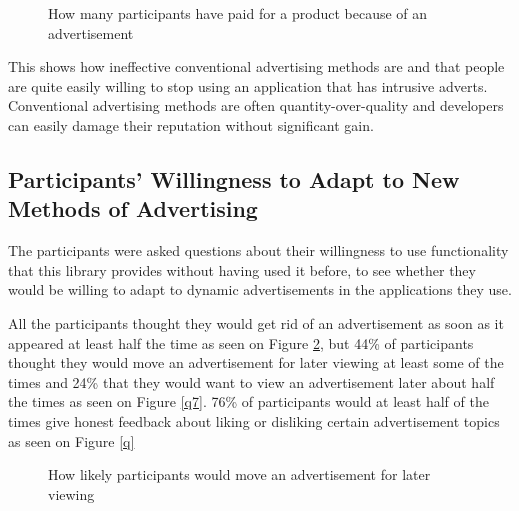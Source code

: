 \begin{figure}
\begin{center}
\caption{How many participants have paid for a product because of an advertisement}
\label{q5}
\end{center}
\end{figure}

This shows how ineffective conventional advertising methods are and that people are quite easily willing to stop using an application that has intrusive adverts. Conventional advertising methods are often quantity-over-quality and developers can easily damage their reputation without significant gain.

\subsection{Participants' Willingness to Adapt to New Methods of Advertising}

The participants were asked questions about their willingness to use functionality that this library provides without having used it before, to see whether they would be willing to adapt to dynamic advertisements in the applications they use.

All the participants thought they would get rid of an advertisement as soon as it appeared at least half the time as seen on Figure \ref{q6}, but 44\% of participants thought they would move an advertisement for later viewing at least some of the times and 24\% that they would want to view an advertisement later about half the times as seen on Figure \ref{q7}. 76\% of participants would at least half of the times give honest feedback about liking or disliking certain advertisement topics as seen on Figure \ref{q}

\begin{figure}
\begin{center}
\caption{How likely participants would move an advertisement for later viewing}
\label{q6}
\end{center}
\end{figure}

